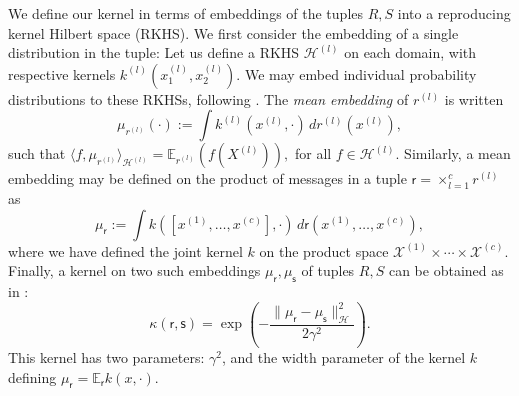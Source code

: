 \documentclass[english]{article}
\theoremstyle{plain}
\theoremstyle{plain}
\begin{document}


We define our kernel in terms of embeddings of the tuples $R,S$ into a reproducing kernel Hilbert space (RKHS). We first consider the embedding of a single distribution
in the tuple: Let us define a RKHS
$\mathcal{H}^{(l)}$ on each domain, with respective kernels $k^{(l)}(x^{(l)}_1,x^{(l)}_2)$.
We may embed individual probability distributions to these RKHSs, following \citep{Smola2007}.
The {\em mean embedding} of $r^{(l)}$ is written
\begin{equation}
\mu_{r^{(l)}}(\cdot) := \int k^{(l)}(x^{(l)},\cdot) \, dr^{(l)} (x^{(l)}),
\end{equation}
such that
$\langle f,\mu_{r^{(l)}} \rangle_{\mathcal{H}^{(l)}} = \mathbb{E}_{r^{(l)}}(f(X^{(l)})), $ for all $f\in \mathcal{H}^{(l)}$.
%
Similarly, a mean embedding may be defined on the product of  messages in a tuple
$\mathsf{r}=\times_{l=1}^{c}r^{(l)}$ as
%
\begin{equation}
\mu_{\mathsf{r}}
:=
\int k([x^{(1)}, \ldots, x^{(c)}],\cdot) \, d\mathsf{r}(x^{(1)}, \ldots, x^{(c)}),
\label{eq:featureOfTuple}
\end{equation}
where we have defined the joint kernel $k$ on the product space
$\mathcal{X}^{(1)}\times\cdots\times\mathcal{X}^{(c)}$.
Finally,  a kernel on two such embeddings $\mu_{\mathsf{r}},\mu_{\mathsf{s}}$ of tuples $R,S$ can be obtained as in \citet[eq. 9]{Christmann2010}:
%
\begin{equation}
\kappa(\mathsf{r}, \mathsf{s}) = \exp\left(-\frac{\|\mu_{\mathsf{r}}-\mu_{\mathsf{s}}\|_{\mathcal{H}}^{2}}{2\gamma^{2}}\right).
\label{eq:gauss_joint_emb}
\end{equation}
%
This kernel has two parameters: $\gamma^{2}$, and the width parameter of the kernel $k$ defining $\mu_{\mathsf{r}} = \mathbb{E}_{\mathsf{r}}k(x,\cdot)$.
\end{document}
